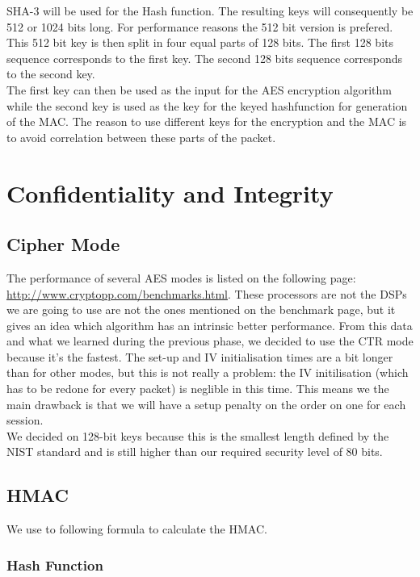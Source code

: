 \documentclass[a4paper]{article}
\begin{document}
SHA-3 will be used for the Hash function. The resulting keys will consequently be 512 or 1024 bits long. For performance reasons the 512 bit version is prefered. This 512 bit key is then split in four equal parts of 128 bits. The first 128 bits sequence corresponds to the first key. The second 128 bits sequence corresponds to the second key.\\

The first key can then be used as the input for the AES encryption algorithm while the second key is used as the key for the keyed hashfunction for generation of the MAC. The reason to use different keys for the encryption and the MAC is to avoid correlation between these parts of the packet.

\section{Confidentiality and Integrity}

\subsection{Cipher Mode}

The performance of several AES modes is listed on the following page: \url{http://www.cryptopp.com/benchmarks.html}. These processors are not the DSPs we are going to use are not the ones mentioned on the benchmark page, but it gives an idea which algorithm has an intrinsic better performance. From this data and what we learned during the previous phase, we decided to use the CTR mode because it's the fastest. The set-up and IV initialisation times are a bit longer than for other modes, but this is not really a problem: the IV initilisation (which has to be redone for every packet) is neglible in this time. This means we the main drawback is that we will have a setup penalty on the order on one {\micro\second} for each session.\\

We decided on 128-bit keys because this is the smallest length defined by the NIST standard and is still higher than our required security level of 80 bits.

\subsection{HMAC}

We use to following formula to calculate the HMAC.

\subsubsection{Hash Function}
\end{document}
